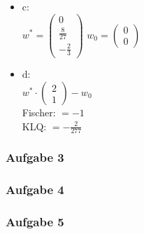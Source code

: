 \documentclass{article}
\begin{document}
\begin{itemize}
	
	\item c: \\ 
		$w^* = 
		\begin{pmatrix}
			0 \\
			\frac{8}{27} \\
			-\frac{2}{3}
		\end{pmatrix}$
		$w_0 = 
			\begin{pmatrix}
			0 \\
			0
			\end{pmatrix}$
	\item d: \\
		$w^* \cdot \begin{pmatrix}
			2\\1
		\end{pmatrix} - w_0$
		\\
		Fischer: 
		$= -1$
		\\
		KLQ:
		$= -\frac{2}{277}$
		\\
\end{itemize}

\subsubsection{Aufgabe 3}

\subsubsection{Aufgabe 4}

\subsubsection{Aufgabe 5}
\end{document}
